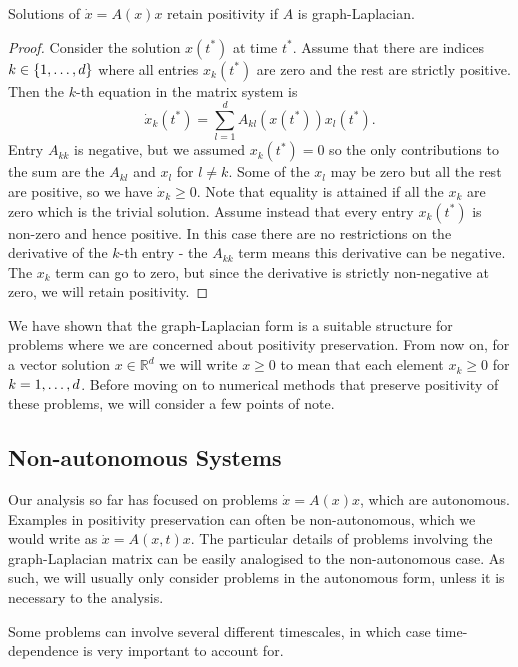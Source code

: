 \begin{theorem}
    Solutions of $\dot{x} = A(x)x$ retain positivity if $A$ is graph-Laplacian.
\end{theorem}
\begin{proof}
    Consider the solution $x(t^*)$ at time $t^*$. Assume that there are indices $k \in \{1,\mathellipsis, d\}$ where all entries $x_k(t^*)$ are zero and the rest are strictly positive.
    Then the $k$-th equation in the matrix system is
    \begin{equation*}
        \dot{x}_k(t^*) = \sum_{l = 1}^{d} A_{kl}(x(t^*))x_l(t^*).
    \end{equation*}
    Entry $A_{kk}$ is negative, but we assumed $x_k(t^*)=0$ so the only contributions to the sum are the $A_{kl}$ and $x_l$ for $l \ne k$.
    Some of the $x_l$ may be zero but all the rest are positive, so we have $\dot{x}_k \ge 0$.
    Note that equality is attained if all the $x_k$ are zero which is the trivial solution. 
    Assume instead that every entry $x_k(t^*)$ is non-zero and hence positive.
    In this case there are no restrictions on the derivative of the $k$-th entry - the $A_{kk}$ term means this derivative can be negative.
    The $x_k$ term can go to zero, but since the derivative is strictly non-negative at zero, we will retain positivity.
\end{proof}

We have shown that the graph-Laplacian form is a suitable structure for problems where we are concerned about positivity preservation.
From now on, for a vector solution $x \in \mathds{R}^d$ we will write $x \ge 0$ to mean that each element $x_k \ge 0$ for $k = 1, \mathellipsis, d$.
Before moving on to numerical methods that preserve positivity of these problems, we will consider a few points of note.

\subsection{Non-autonomous Systems}

Our analysis so far has focused on problems $\dot{x} = A(x)x$, which are autonomous.
Examples in positivity preservation can often be non-autonomous, which we would write as $\dot{x} = A(x,t)x$.
The particular details of problems involving the graph-Laplacian matrix can be easily analogised to the non-autonomous case.
As such, we will usually only consider problems in the autonomous form, unless it is necessary to the analysis.

Some problems can involve several different timescales,
in which case time-dependence is very important to account for.


